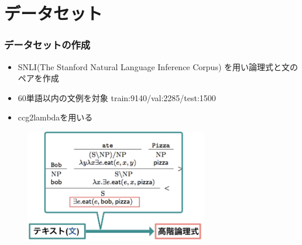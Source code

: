 \documentclass[dvipdfmx]{beamer}
\begin{document}

\section{データセット}
\begin{frame}
\frametitle{データセットの作成}
\begin{itemize}
  \item
SNLI(The Stanford Natural Language Inference Corpus) \citep{snli:emnlp2015}を用い論理式と文のペアを作成

\item 60単語以内の文例を対象
train:9140/val:2285/test:1500\\

\item ccg2lambdaを用いる

\end{itemize}
\begin{center}
\begin{figure}[h]
	\includegraphics[width=8cm]{editdata.png}
        \label{fig:editdata}
\end{figure}
\end{center}

\end{frame}
\end{document}
